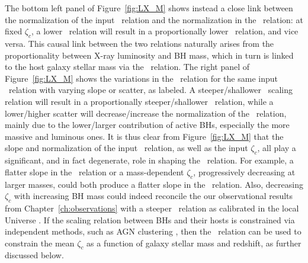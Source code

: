 The bottom left panel of Figure~\ref{fig:LX_M} shows instead a close link between the normalization of the input \MBHMS\ relation and the normalization in the \LXMS\ relation: at fixed $\zeta_c$, a lower \MBHMS\ relation will result in a proportionally lower \LXMS\ relation, and vice versa. This causal link between the two relations naturally arises from the proportionality between X-ray luminosity and BH mass, which in turn is linked to the host galaxy stellar mass via the \MBHMS\ relation. The right panel of Figure~\ref{fig:LX_M} shows the variations in the \LXMS\ relation for the same input \MBHMS\ relation with varying slope or scatter, as labeled. A steeper/shallower \MBHMS\ scaling relation will result in a proportionally steeper/shallower \LXMS\ relation, while a lower/higher scatter will decrease/increase the normalization of the \LXMS\ relation, mainly due to the lower/larger contribution of active BHs, especially the more massive and luminous ones. It is thus clear from Figure~\ref{fig:LX_M} that the slope and normalization of the input \MBHMS\ relation, as well as the input $\zeta_c$, all play a significant, and in fact degenerate, role in shaping the \LXMS\ relation. For example, a flatter slope in the \MBHMS\ relation or a mass-dependent $\zeta_c$, progressively decreasing at larger masses, could both produce a flatter slope in the \LXMS\ relation. Also, decreasing $\zeta_c$ with increasing BH mass could indeed reconcile the our observational results from Chapter~\ref{ch:observations} with a steeper \MBHMS\ relation as calibrated in the local Universe \citep[e.g.,][]{2016MNRAS.460.3119S,2018ApJ...869..113D}. If the scaling relation between BHs and their hosts is constrained via independent methods, such as AGN clustering \citep[e.g.,][]{ShankarNat,Allevato21}, then the \LXMS\ relation can be used to constrain the mean $\zeta_c$ as a function of galaxy stellar mass and redshift, as further discussed below.


